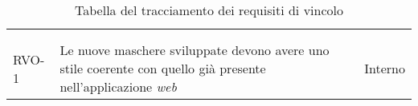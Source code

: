 \begin{center}
    {
      \renewcommand{\arraystretch}{1}
      \begin{longtable}{
        |>{\centering\arraybackslash}p{60pt}
        |>{\centering\arraybackslash}p{220pt}
        |>{\centering\arraybackslash}p{60pt}|}
  
        \rowcolor{antimaincolor!0}
        \caption{\label{tab:requisiti-vincolo}Tabella del tracciamento dei requisiti di vincolo}                                             \\
  
        \hline
        \rowcolor{maincolor}
        \color{antimaincolor}{Requisito}                                                                 &
        \color{antimaincolor}{Descrizione}                                                               &
        \color{antimaincolor}{Fonte}                                                                               \\
        \hline
        \endhead
  
        \rowcolor{maincolor}
        \color{antimaincolor}{Requisito}                                                                 &
        \color{antimaincolor}{Descrizione}                                                               &
        \color{antimaincolor}{Fonte}                                                                               \\
        \hline
        \endfoot
  
        RVO-1     & Le nuove maschere sviluppate devono avere uno stile coerente con quello già presente nell'applicazione \textit{web} & Interno \\
        \hline
                
                                                                     
      \end{longtable}
      \renewcommand{\arraystretch}{1}
    }
  
  \end{center}